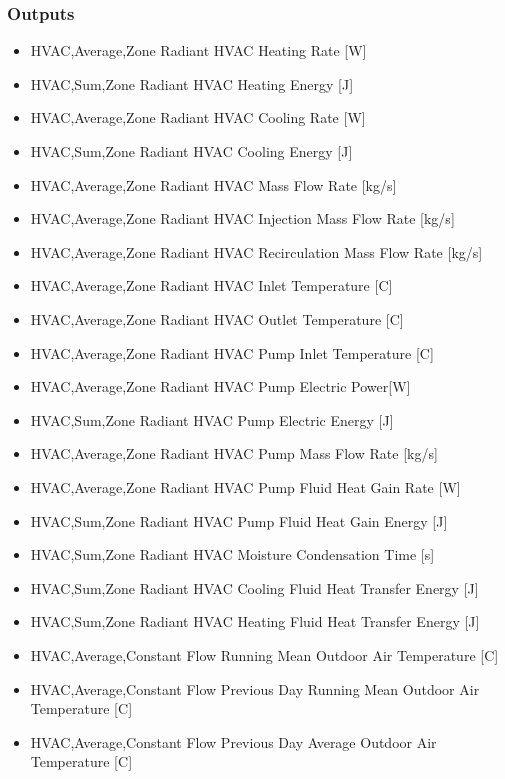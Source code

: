 \subsubsection{Outputs}\label{outputs-6-007}

\begin{itemize}
\item
  HVAC,Average,Zone Radiant HVAC Heating Rate {[}W{]}
\item
  HVAC,Sum,Zone Radiant HVAC Heating Energy {[}J{]}
\item
  HVAC,Average,Zone Radiant HVAC Cooling Rate {[}W{]}
\item
  HVAC,Sum,Zone Radiant HVAC Cooling Energy {[}J{]}
\item
  HVAC,Average,Zone Radiant HVAC Mass Flow Rate {[}kg/s{]}
\item
  HVAC,Average,Zone Radiant HVAC Injection Mass Flow Rate {[}kg/s{]}
\item
  HVAC,Average,Zone Radiant HVAC Recirculation Mass Flow Rate {[}kg/s{]}
\item
  HVAC,Average,Zone Radiant HVAC Inlet Temperature {[}C{]}
\item
  HVAC,Average,Zone Radiant HVAC Outlet Temperature {[}C{]}
\item
  HVAC,Average,Zone Radiant HVAC Pump Inlet Temperature {[}C{]}
\item
  HVAC,Average,Zone Radiant HVAC Pump Electric Power{[}W{]}
\item
  HVAC,Sum,Zone Radiant HVAC Pump Electric Energy {[}J{]}
\item
  HVAC,Average,Zone Radiant HVAC Pump Mass Flow Rate {[}kg/s{]}
\item
  HVAC,Average,Zone Radiant HVAC Pump Fluid Heat Gain Rate {[}W{]}
\item
  HVAC,Sum,Zone Radiant HVAC Pump Fluid Heat Gain Energy {[}J{]}
\item
  HVAC,Sum,Zone Radiant HVAC Moisture Condensation Time {[}s{]}
\item
  HVAC,Sum,Zone Radiant HVAC Cooling Fluid Heat Transfer Energy {[}J{]}
\item
  HVAC,Sum,Zone Radiant HVAC Heating Fluid Heat Transfer Energy {[}J{]}
\item
  HVAC,Average,Constant Flow Running Mean Outdoor Air Temperature {[}C{]}
\item
  HVAC,Average,Constant Flow Previous Day Running Mean Outdoor Air Temperature {[}C{]}
\item
  HVAC,Average,Constant Flow Previous Day Average Outdoor Air Temperature {[}C{]}
\end{itemize}

